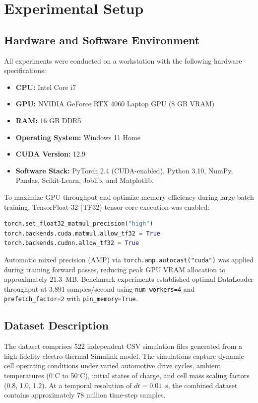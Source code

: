 \section{Experimental Setup}

\subsection{Hardware and Software Environment}
All experiments were conducted on a workstation with the following hardware specifications:
\begin{itemize}
    \item \textbf{CPU:} Intel Core i7
    \item \textbf{GPU:} NVIDIA GeForce RTX 4060 Laptop GPU (8 GB VRAM)
    \item \textbf{RAM:} 16 GB DDR5
    \item \textbf{Operating System:} Windows 11 Home
    \item \textbf{CUDA Version:} 12.9
    \item \textbf{Software Stack:} PyTorch 2.4 (CUDA-enabled), Python 3.10, NumPy, Pandas, Scikit-Learn, Joblib, and Matplotlib.
\end{itemize}

To maximize GPU throughput and optimize memory efficiency during large-batch training, TensorFloat-32 (TF32) tensor core execution was enabled:
\begin{lstlisting}[language=Python]
torch.set_float32_matmul_precision("high")
torch.backends.cuda.matmul.allow_tf32 = True
torch.backends.cudnn.allow_tf32 = True
\end{lstlisting}
Automatic mixed precision (AMP) via \texttt{torch.amp.autocast("cuda")} was applied during training forward passes, reducing peak GPU VRAM allocation to approximately 21.3~MB. Benchmark experiments established optimal DataLoader throughput at 3,891 samples/second using \texttt{num\_workers=4} and \texttt{prefetch\_factor=2} with \texttt{pin\_memory=True}.

\subsection{Dataset Description}
The dataset comprises 522 independent CSV simulation files generated from a high-fidelity electro-thermal Simulink model. The simulations capture dynamic cell operating conditions under varied automotive drive cycles, ambient temperatures (0$^\circ$C to 50$^\circ$C), initial states of charge, and cell mass scaling factors (0.8, 1.0, 1.2). At a temporal resolution of $dt = 0.01$~s, the combined dataset contains approximately 78 million time-step samples.

